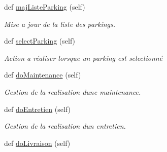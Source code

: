 \begin{DoxyCompactItemize}
\item 
\hypertarget{classsrc_1_1c_1_1_main_1_1_main_a9efcebb8f2dd7ea80b5f9c06987887be}{}def \hyperlink{classsrc_1_1c_1_1_main_1_1_main_a9efcebb8f2dd7ea80b5f9c06987887be}{maj\+Liste\+Parking} (self)\label{classsrc_1_1c_1_1_main_1_1_main_a9efcebb8f2dd7ea80b5f9c06987887be}

\begin{DoxyCompactList}\small\item\em Mise a jour de la liste des parkings. \end{DoxyCompactList}\item 
\hypertarget{classsrc_1_1c_1_1_main_1_1_main_a107fd24953172b707bd5e46b2fff648a}{}def \hyperlink{classsrc_1_1c_1_1_main_1_1_main_a107fd24953172b707bd5e46b2fff648a}{select\+Parking} (self)\label{classsrc_1_1c_1_1_main_1_1_main_a107fd24953172b707bd5e46b2fff648a}

\begin{DoxyCompactList}\small\item\em Action a réaliser lorsque un parking est selectionné \end{DoxyCompactList}\item 
\hypertarget{classsrc_1_1c_1_1_main_1_1_main_a2635e767aabbc3c9fe3c8cdfeb28157b}{}def \hyperlink{classsrc_1_1c_1_1_main_1_1_main_a2635e767aabbc3c9fe3c8cdfeb28157b}{do\+Maintenance} (self)\label{classsrc_1_1c_1_1_main_1_1_main_a2635e767aabbc3c9fe3c8cdfeb28157b}

\begin{DoxyCompactList}\small\item\em Gestion de la realisation d\textquotesingle{}une maintenance. \end{DoxyCompactList}\item 
\hypertarget{classsrc_1_1c_1_1_main_1_1_main_a24ca01014993a17e294dbf4ea5ed2e1b}{}def \hyperlink{classsrc_1_1c_1_1_main_1_1_main_a24ca01014993a17e294dbf4ea5ed2e1b}{do\+Entretien} (self)\label{classsrc_1_1c_1_1_main_1_1_main_a24ca01014993a17e294dbf4ea5ed2e1b}

\begin{DoxyCompactList}\small\item\em Gestion de la realisation d\textquotesingle{}un entretien. \end{DoxyCompactList}\item 
\hypertarget{classsrc_1_1c_1_1_main_1_1_main_a5beabde29de7083761035bdc67a77eed}{}def \hyperlink{classsrc_1_1c_1_1_main_1_1_main_a5beabde29de7083761035bdc67a77eed}{do\+Livraison} (self)\label{classsrc_1_1c_1_1_main_1_1_main_a5beabde29de7083761035bdc67a77eed}


\end{DoxyCompactItemize}

